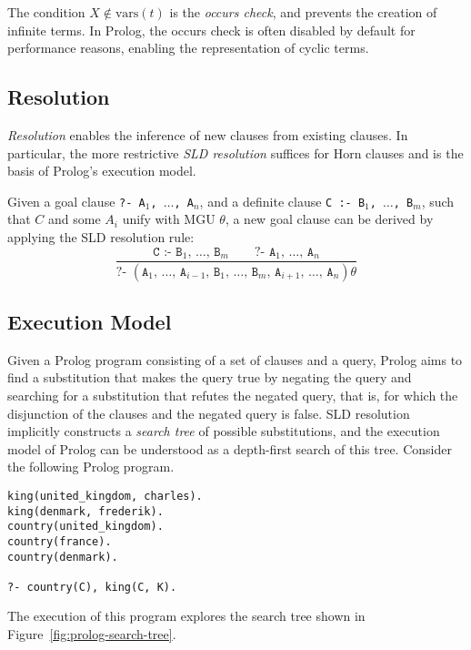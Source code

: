 The condition $X \notin \text{vars}(t)$ is the \emph{occurs check}, and prevents the creation of infinite terms. In Prolog, the occurs check is often disabled by default for performance reasons, enabling the representation of cyclic terms.

\subsection{Resolution}

\emph{Resolution} enables the inference of new clauses from existing clauses. In particular, the more restrictive \emph{SLD resolution} suffices for Horn clauses and is the basis of Prolog's execution model.

Given a goal clause \texttt{?- A$_1$, $\ldots$, A$_n$}, and a definite clause \texttt{C :- B$_1$, $\ldots$, B$_m$}, such that $C$ and some $A_i$ unify with MGU $\theta$, a new goal clause can be derived by applying the SLD resolution rule:
$$
\frac{\texttt{C :- B$_1$, $\ldots$, B$_m$} \qquad \texttt{?- A$_1$, $\ldots$, A$_n$}}
{\texttt{?- } (\texttt{A$_1$, $\ldots$, A$_{i-1}$, B$_1$, $\ldots$, B$_m$, A$_{i+1}$, $\ldots$, A$_n$})\theta}
$$

\subsection{Execution Model}

Given a Prolog program consisting of a set of clauses and a query, Prolog aims to find a substitution that makes the query true by negating the query and searching for a substitution that refutes the negated query, that is, for which the disjunction of the clauses and the negated query is false. SLD resolution implicitly constructs a \emph{search tree} of possible substitutions, and the execution model of Prolog can be understood as a depth-first search of this tree. Consider the following Prolog program.

\begin{center}
\begin{verbatim}
king(united_kingdom, charles).
king(denmark, frederik).
country(united_kingdom).
country(france).
country(denmark).

?- country(C), king(C, K).
\end{verbatim}
\end{center}

The execution of this program explores the search tree shown in Figure~\ref{fig:prolog-search-tree}.

